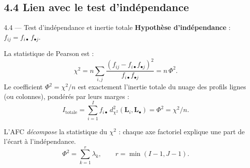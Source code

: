 \subsection{4.4 Lien avec le test d'indépendance}
\begin{frame}{4.4 — Test d'indépendance et inertie totale}
\textbf{Hypothèse d'indépendance} : $f_{ij} = f_{i\bullet} \, f_{\bullet j}$.

\begin{theorem}
La statistique de Pearson est :
\[
\chi^2 = n \sum_{i,j} \frac{(f_{ij} - f_{i\bullet} f_{\bullet j})^2}{f_{i\bullet} f_{\bullet j}}
       = n \, \Phi^2.
\]
Le coefficient $\Phi^2 = \chi^2 / n$ est exactement l'\alert{inertie totale} du
nuage des profils lignes (ou colonnes), pondérés par leurs marges :
\[
\boxed{\;
I_{\text{totale}}
= \sum_{i=1}^I f_{i\bullet}\, d_{\chi^2}^2(\mathbf{L}_i, \mathbf{L}_{\bullet})
= \Phi^2 = \chi^2 / n.
\;}
\]
\end{theorem}

\begin{rema}[Conséquence]
\small L'AFC \emph{décompose} la statistique du $\chi^2$ : chaque axe factoriel
explique une part de l'écart à l'indépendance.
\[
\Phi^2 = \sum_{k=1}^{r} \lambda_k, \qquad r = \min(I-1, J-1).
\]
\end{rema}
\end{frame}


